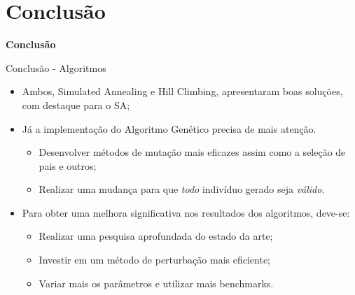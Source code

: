 \documentclass[compress, hide notes]{beamer}
\let\olditem=\item%
\renewcommand{\item}{\olditem \justifying}%
\begin{document}
    
    
\section{Conclusão}
	\begin{frame}{}
		\centering
		\Huge \color{blue} \textbf{Conclusão}
	\end{frame}
    
	\begin{frame}{Conclusão - Algoritmos}
		
		\begin{itemize}
			
			\item Ambos, Simulated Annealing e Hill Climbing, apresentaram boas soluções, com destaque para o SA;
			
			\bigskip
			\item Já a implementação do Algoritmo Genético precisa de mais atenção.
           	
            \begin{itemize}
				\item Desenvolver métodos de mutação mais eficazes assim como a seleção de pais e outros;
                
                \bigskip
                
                \item Realizar uma mudança para que \textit{todo} indivíduo gerado seja \textit{válido}.
			\end{itemize}
            
			\bigskip
            \bigskip
			
			\item Para obter uma melhora significativa nos resultados dos algoritmos, deve-se:
            \begin{itemize}
                \item Realizar uma pesquisa aprofundada do estado da arte;
                
               \bigskip
               
            	\item Investir em um método de perturbação mais eficiente;
			\bigskip
                \item Variar mais os parâmetros e utilizar mais benchmarks.
                
            \end{itemize}
			
		\end{itemize}
		
	\end{frame}
    
\end{document}
